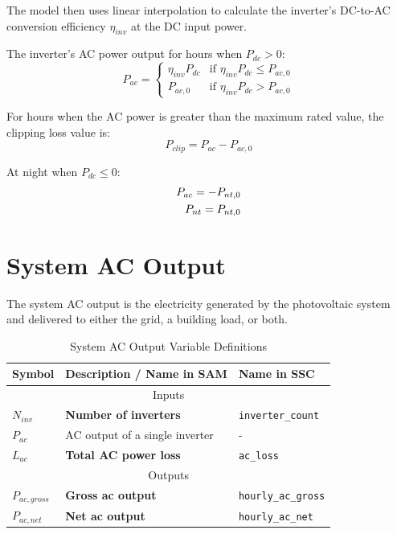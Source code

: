 \documentclass[12pt,letterpaper]{article}
\begin{document}
The model then uses linear interpolation to calculate the inverter's DC-to-AC conversion efficiency $\eta_{inv}$ at the DC input power.

The inverter's AC power output for hours when $P_{dc}>0$:
\begin{equation}
P_{ac} = \left\{
\begin{array}{ll}
\eta_{inv} P_{dc} & \text{if $\eta_{inv} P_{dc} \leq P_{ac,0}$}\\
P_{ac,0} & \text{if $\eta_{inv} P_{dc} > P_{ac,0}$} 
\end{array}\right.
\end{equation}

For hours when the AC power is greater than the maximum rated value, the clipping loss value is:
\begin{equation}
P_{clip} = P_{ac} - P_{ac,0}
\end{equation}

At night when $P_{dc} \leq 0$:
\begin{align}
P_{ac} = -P_{nt,0} \notag\\
P_{nt} = P_{nt,0}
\end{align}


\chapter{System AC Output}

The system AC output is the electricity generated by the photovoltaic system and delivered to either the grid, a building load, or both.
\begin{table}
\begin{center}
\caption{System AC Output Variable Definitions}
\begin{tabular}{lll}
\midrule
Symbol & Description / \textbf{Name in SAM} & Name in SSC \\
\midrule
\multicolumn{3}{c}{Inputs}\\
$N_{inv}$ & \textbf{Number of inverters} & \texttt{inverter\_count} \\
$P_{ac}$ & AC output of a single inverter & - \\
$L_{ac}$ & \textbf{Total AC power loss} & \texttt{ac\_loss} \\
\midrule
\multicolumn{3}{c}{Outputs}\\
$P_{ac,gross}$ & \textbf{Gross ac output} & \texttt{hourly\_ac\_gross} \\
$P_{ac,net}$ & \textbf{Net ac output} & \texttt{hourly\_ac\_net} \\
\hline
\end{tabular}
\label{tab-systemacoutputvars}
\end{center}
\end{table}
\end{document}
